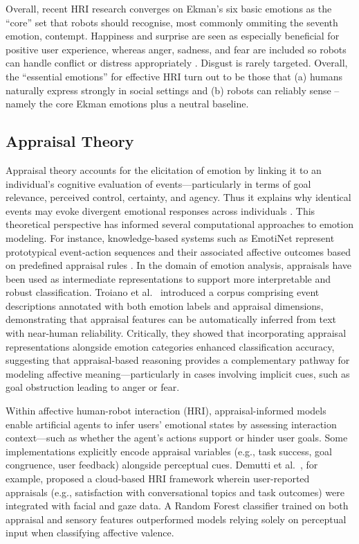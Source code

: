 Overall, recent HRI research converges on Ekman's six basic emotions as the ``core'' set that robots should recognise, most commonly ommiting the seventh emotion, contempt. Happiness and surprise are seen as especially beneficial for positive user experience, whereas anger, sadness, and fear are included so robots can handle conflict or distress appropriately \cite{Chuah2021-zw}. Disgust is rarely targeted. Overall, the ``essential emotions'' for effective HRI turn out to be those that (a) humans naturally express strongly in social settings and (b) robots can reliably sense – namely the core Ekman emotions plus a neutral baseline.

\subsection{Appraisal Theory}

Appraisal theory accounts for the elicitation of emotion by linking it to an individual's cognitive evaluation of events—particularly in terms of goal relevance, perceived control, certainty, and agency. Thus it explains why identical events may evoke divergent emotional responses across individuals \cite{Suhaila_2021-ez}. This theoretical perspective has informed several computational approaches to emotion modeling. For instance, knowledge-based systems such as EmotiNet represent prototypical event-action sequences and their associated affective outcomes based on predefined appraisal rules \cite{Balahur2011-mb}. In the domain of emotion analysis, appraisals have been used as intermediate representations to support more interpretable and robust classification. Troiano et al.\ \cite{Troiano2023-if} introduced a corpus comprising event descriptions annotated with both emotion labels and appraisal dimensions, demonstrating that appraisal features can be automatically inferred from text with near-human reliability. Critically, they showed that incorporating appraisal representations alongside emotion categories enhanced classification accuracy, suggesting that appraisal-based reasoning provides a complementary pathway for modeling affective meaning—particularly in cases involving implicit cues, such as goal obstruction leading to anger or fear.

Within affective human-robot interaction (HRI), appraisal-informed models enable artificial agents to infer users' emotional states by assessing interaction context—such as whether the agent's actions support or hinder user goals. Some implementations explicitly encode appraisal variables (e.g., task success, goal congruence, user feedback) alongside perceptual cues. Demutti et al.\ \cite{Demutti2022-vz}, for example, proposed a cloud-based HRI framework wherein user-reported appraisals (e.g., satisfaction with conversational topics and task outcomes) were integrated with facial and gaze data. A Random Forest classifier trained on both appraisal and sensory features outperformed models relying solely on perceptual input when classifying affective valence.

